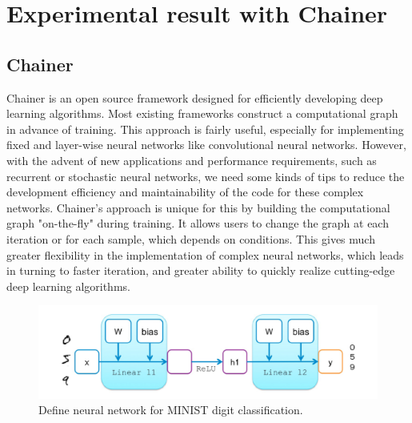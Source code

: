\documentclass[12pt]{article}
\begin{document}
\section{Experimental result with Chainer}
\subsection{Chainer}
Chainer is an open source framework designed for efficiently developing deep learning algorithms. Most existing frameworks construct a computational graph in advance of training. This approach is fairly useful, especially for implementing fixed and layer-wise neural networks like convolutional neural networks. However, with the advent of new applications and performance requirements, such as recurrent or stochastic neural networks, we need some kinds of tips to reduce the development efficiency and maintainability of the code for these complex networks. Chainer’s approach is unique for this by building the computational graph "on-the-fly" during training. It allows users to change the graph at each iteration or for each sample, which depends on conditions. This gives much greater flexibility in the implementation of complex neural networks, which leads in turning to faster iteration, and greater ability to quickly realize cutting-edge deep learning algorithms.

\begin{figure}[H]
\centering
\includegraphics[scale = 0.9]{chainer29.png}
\caption{Define neural network for MINIST digit classification.}
\end{figure}
\end{document}
